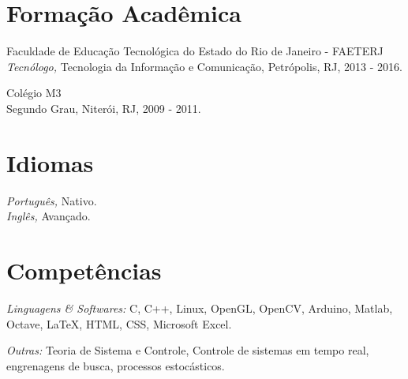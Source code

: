 \documentclass[margin, 10pt]{res} %
\begin{document}
\begin{resume}

\section{Formação Acadêmica}
Faculdade de Educação Tecnológica do Estado do Rio de Janeiro - FAETERJ \\
{\sl Tecnólogo,} Tecnologia da Informação e Comunicação, Petrópolis, RJ, 2013 - 2016.

Colégio M3 \\
Segundo Grau, Niterói, RJ, 2009 - 2011.
 

\section{Idiomas}
{\sl Português,} Nativo.\\
{\sl Inglês,} Avançado.


\section{Competências} 
{\sl Linguagens \& Softwares:} C, C++, Linux, OpenGL, OpenCV, Arduino, Matlab, Octave, LaTeX, HTML, CSS, Microsoft Excel.

{\sl Outras:} Teoria de Sistema e Controle, Controle de sistemas em tempo real, engrenagens de busca, processos estocásticos.
 


\end{resume}
\end{document}
